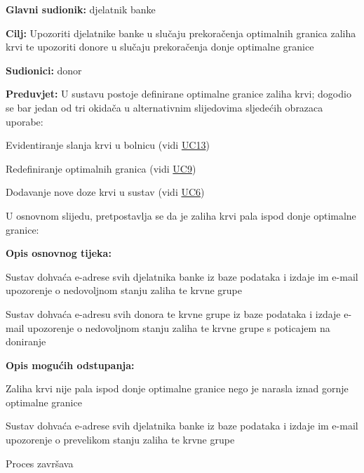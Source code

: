 					\begin{packed_item} \label{UC14}
	
						\item \textbf{Glavni sudionik: }djelatnik banke
						\item  \textbf{Cilj:} Upozoriti djelatnike banke u slučaju prekoračenja optimalnih granica zaliha krvi te upozoriti donore u slučaju prekoračenja donje optimalne granice
						\item  \textbf{Sudionici:} donor
						\item  \textbf{Preduvjet:} U sustavu postoje definirane optimalne granice zaliha krvi; dogodio se bar jedan od tri okidača u alternativnim slijedovima sljedećih obrazaca uporabe:
						\begin{packed_enum}
						    \item Evidentiranje slanja krvi u bolnicu (vidi \hyperref[UC13]{UC13})
						     \item Redefiniranje optimalnih granica (vidi \hyperref[UC9]{UC9})
						     \item Dodavanje nove doze krvi u sustav (vidi \hyperref[UC6]{UC6})
						\end{packed_enum}
						U osnovnom slijedu, pretpostavlja se da je zaliha krvi pala ispod donje optimalne granice:
						\item  \textbf{Opis osnovnog tijeka:}
						\item[] \begin{packed_enum}

	                        \item Sustav dohvaća e-adrese svih djelatnika banke iz baze podataka i izdaje im e-mail upozorenje o nedovoljnom stanju zaliha te krvne grupe 
	                        \item Sustav dohvaća e-adresu svih donora te krvne grupe iz baze podataka i izdaje e-mail upozorenje o nedovoljnom stanju zaliha te krvne grupe s poticajem na doniranje 
	                       
    						
						\end{packed_enum}
						
						\item  \textbf{Opis mogućih odstupanja:}
						
						\item[] \begin{packed_item}
						
							\item[] Zaliha krvi nije pala ispod donje optimalne granice nego je narasla iznad gornje optimalne granice
							\item[] \begin{packed_enum} 
    	                        \item Sustav dohvaća e-adrese svih djelatnika banke iz baze podataka i izdaje im e-mail upozorenje o prevelikom stanju zaliha te krvne grupe 
    	                        \item Proces završava
							\end{packed_enum}

						\end{packed_item}
						
					\end{packed_item}
					
